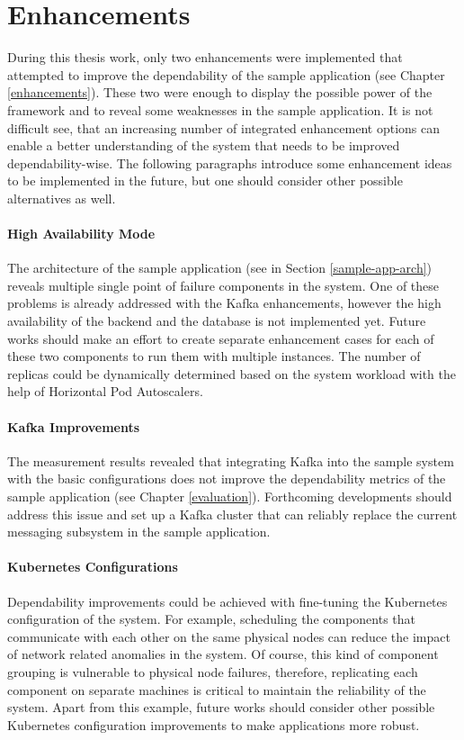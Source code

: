 \section{Enhancements}

During this thesis work, only two enhancements were implemented that attempted to improve the dependability of the sample application (see Chapter \ref{enhancements}). These two were enough to display the possible power of the framework and to reveal some weaknesses in the sample application. It is not difficult see, that an increasing number of integrated enhancement options can enable a better understanding of the system that needs to be improved dependability-wise. The following paragraphs introduce some enhancement ideas to be implemented in the future, but one should consider other possible alternatives as well.

\paragraph{High Availability Mode} The architecture of the sample application (see in Section \ref{sample-app-arch}) reveals multiple single point of failure components in the system. One of these problems is already addressed with the Kafka enhancements, however the high availability of the backend and the database is not implemented yet. Future works should make an effort to create separate enhancement cases for each of these two components to run them with multiple instances. The number of replicas could be dynamically determined based on the system workload with the help of Horizontal Pod Autoscalers.

\paragraph{Kafka Improvements} The measurement results revealed that integrating Kafka into the sample system with the basic configurations does not improve the dependability metrics of the sample application (see Chapter \ref{evaluation}). Forthcoming developments should address this issue and set up a Kafka cluster that can reliably replace the current messaging subsystem in the sample application. 

\paragraph{Kubernetes Configurations} Dependability improvements could be achieved with fine-tuning the Kubernetes configuration of the system. For example, scheduling the components that communicate with each other on the same physical nodes can reduce the impact of network related anomalies in the system. Of course, this kind of component grouping is vulnerable to physical node failures, therefore, replicating each component on separate machines is critical to maintain the reliability of the system. Apart from this example, future works should consider other possible Kubernetes configuration improvements to make applications more robust.
